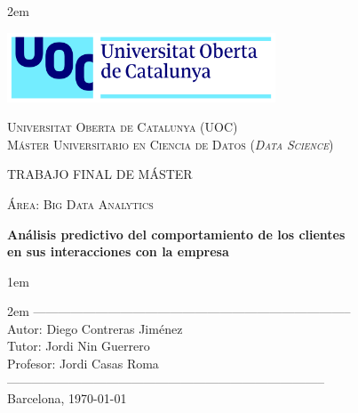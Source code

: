 \newpage
\thispagestyle{empty}

\baselineskip 2em


\centerline{\includegraphics[width=0.6\textwidth]{images/UOC-logo}}
\begin{center}
\textsc{Universitat Oberta de Catalunya (UOC) \\
 Máster Universitario en Ciencia de Datos (\textit{Data Science})\\}


\vspace*{1.5cm}

\textsc{\Large TRABAJO FINAL DE MÁSTER}

\vspace*{0.5cm}

\textsc{\large Área: Big Data Analytics}



\vspace*{2.0cm}

\textbf{\Large Análisis predictivo del comportamiento de los clientes \\
en sus interacciones con la empresa}

\vspace{2.5cm}
\baselineskip 1em

\baselineskip 2em
-----------------------------------------------------------------------------\\
Autor:      Diego Contreras Jiménez\\
Tutor:      Jordi Nin Guerrero\\
Profesor:   Jordi Casas Roma\\
-----------------------------------------------------------------------------\\
\vspace*{1.5cm}
Barcelona, \today

\end{center}

\newpage
\pagestyle{empty}
\hfill
